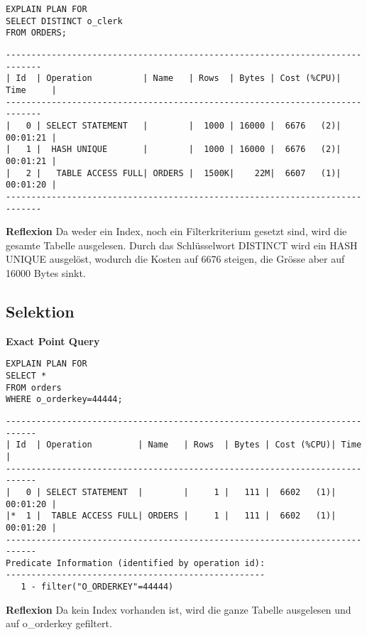 \documentclass[10pt]{article}
\begin{document}
\begin{lstlisting}[style=sql]
EXPLAIN PLAN FOR
SELECT DISTINCT o_clerk
FROM ORDERS;
\end{lstlisting}
\begin{lstlisting}[style=queryexecutionplan]
-----------------------------------------------------------------------------
| Id  | Operation          | Name   | Rows  | Bytes | Cost (%CPU)| Time     |
-----------------------------------------------------------------------------
|   0 | SELECT STATEMENT   |        |  1000 | 16000 |  6676   (2)| 00:01:21 |
|   1 |  HASH UNIQUE       |        |  1000 | 16000 |  6676   (2)| 00:01:21 |
|   2 |   TABLE ACCESS FULL| ORDERS |  1500K|    22M|  6607   (1)| 00:01:20 |
-----------------------------------------------------------------------------
\end{lstlisting}
\textbf{Reflexion} \newline
Da weder ein Index, noch ein Filterkriterium gesetzt sind, wird die gesamte Tabelle ausgelesen. Durch das Schlüsselwort DISTINCT wird ein HASH UNIQUE ausgelöst, wodurch die Kosten auf 6676 steigen, die Grösse aber auf 16000 Bytes sinkt.
\subsection{Selektion}
\textbf{Exact Point Query}
\begin{lstlisting}[style=sql]
EXPLAIN PLAN FOR
SELECT *
FROM orders
WHERE o_orderkey=44444;
\end{lstlisting}
\begin{lstlisting}[style=queryexecutionplan]
----------------------------------------------------------------------------
| Id  | Operation         | Name   | Rows  | Bytes | Cost (%CPU)| Time     |
----------------------------------------------------------------------------
|   0 | SELECT STATEMENT  |        |     1 |   111 |  6602   (1)| 00:01:20 |
|*  1 |  TABLE ACCESS FULL| ORDERS |     1 |   111 |  6602   (1)| 00:01:20 |
----------------------------------------------------------------------------
Predicate Information (identified by operation id):
---------------------------------------------------
   1 - filter("O_ORDERKEY"=44444)
\end{lstlisting}
\textbf{Reflexion} \newline
Da kein Index vorhanden ist, wird die ganze Tabelle ausgelesen und auf o\_orderkey gefiltert.
\end{document}

